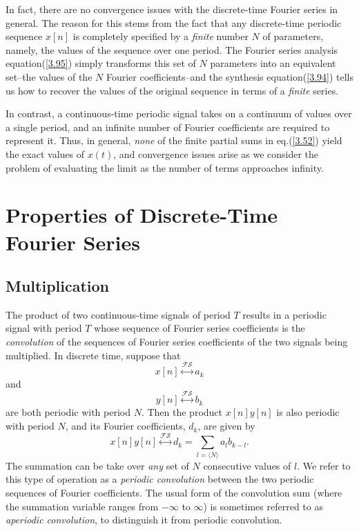 \documentclass[a4paper,twoside]{book}
\begin{document}
In fact, there are no convergence issues with the discrete-time Fourier series in general. The reason for this stems from the fact that any discrete-time periodic sequence $x[n]$ is completely specified by a \textit{finite} number $N$ of parameters, namely, the values of the sequence over one period. The Fourier series analysis equation\;(\ref{3.95}) simply transforms this set of $N$ parameters into an equivalent set--the values of the $N$ Fourier coefficients--and the synthesis equation\;(\ref{3.94}) tells us how to recover the values of the original sequence in terms of a \textit{finite} series.

In contrast, a continuous-time periodic signal takes on a continuum of values over a single period, and an infinite number of Fourier coefficients are required to represent it. Thus, in general, \textit{none} of the finite partial sums in eq.\;(\ref{3.52}) yield the exact values of $x(t)$, and convergence issues arise as we consider the problem of evaluating the limit as the number of terms approaches infinity.

\section{Properties of Discrete-Time Fourier Series}
\subsection{Multiplication}
The product of two continuous-time signals of period $T$ results in a periodic signal with period $T$ whose sequence of Fourier series coefficients is the \textit{convolution} of the sequences of Fourier series coefficients of the two signals being multiplied. In discrete time, suppose that $$x[n]\overset{\mathcal{FS}}{\longleftrightarrow}a_k$$ and $$y[n]\overset{\mathcal{FS}}{\longleftrightarrow}b_k$$ are both periodic with period $N$. Then the product $x[n]y[n]$ is also periodic with period $N$, and its Fourier coefficients, $d_k$, are given by
\begin{equation}
    x[n]y[n]\overset{\mathcal{FS}}{\longleftrightarrow} d_k=\sum_{l=\langle N\rangle}a_lb_{k-l}.
    \label{3.108}
\end{equation}
The summation can be take over \textit{any} set of $N$ consecutive values of $l$. We refer to this type of operation as a \textit{periodic convolution} between the two periodic sequences of Fourier coefficients. The usual form of the convolution sum (where the summation variable ranges from $-\infty$ to $\infty$) is sometimes referred to as \textit{aperiodic convolution}, to distinguish it from periodic convolution.
\end{document}
